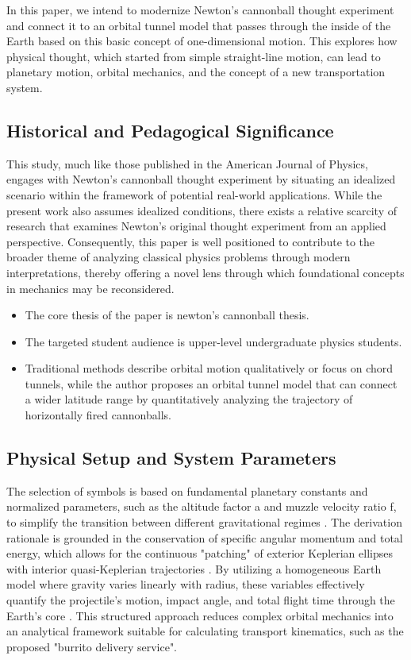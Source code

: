 \documentclass[11pt,letterpaper]{article}
\begin{document}
In this paper, we intend to modernize Newton's cannonball thought experiment and connect it to an orbital tunnel model that passes through the inside of the Earth based on this basic concept of one-dimensional motion. This explores how physical thought, which started from simple straight-line motion, can lead to planetary motion, orbital mechanics, and the concept of a new transportation system.
\subsection{Historical and Pedagogical Significance}
This study, much like those published in the American Journal of Physics, engages with Newton’s cannonball thought experiment by situating an idealized scenario within the framework of potential real-world applications. While the present work also assumes idealized conditions, there exists a relative scarcity of research that examines Newton’s original thought experiment from an applied perspective. Consequently, this paper is well positioned to contribute to the broader theme of analyzing classical physics problems through modern interpretations, thereby offering a novel lens through which foundational concepts in mechanics may be reconsidered.
\begin{itemize}
\item The core thesis of the paper is newton's cannonball thesis.
\item The targeted student audience is upper-level undergraduate physics students.
\item Traditional methods describe orbital motion qualitatively or focus on chord tunnels, while the author proposes an orbital tunnel model that can connect a wider latitude range by quantitatively analyzing the trajectory of horizontally fired cannonballs.
\end{itemize}

\subsection{Physical Setup and System Parameters}

The selection of symbols is based on fundamental planetary constants and normalized parameters, such as the altitude factor a and muzzle velocity ratio f, to simplify the transition between different gravitational regimes
. The derivation rationale is grounded in the conservation of specific angular momentum and total energy, which allows for the continuous "patching" of exterior Keplerian ellipses with interior quasi-Keplerian trajectories
. By utilizing a homogeneous Earth model where gravity varies linearly with radius, these variables effectively quantify the projectile's motion, impact angle, and total flight time through the Earth's core
. This structured approach reduces complex orbital mechanics into an analytical framework suitable for calculating transport kinematics, such as the proposed "burrito delivery service".
\end{document}
